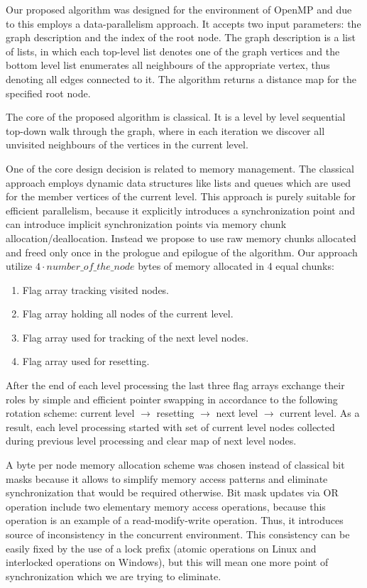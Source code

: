 \documentclass[letterpaper]{article}
\begin{document}
		
		
			Our proposed algorithm was designed for the environment of OpenMP and due to this employs a data-parallelism approach. 
			It accepts two input parameters: the graph description and the index of the root node.
			The graph description is a list of lists, in which each top-level list denotes one of the graph vertices and the bottom level list enumerates all neighbours of the appropriate vertex, thus denoting all edges connected to it.
			The algorithm returns a distance map for the specified root node.
			
			The core of the proposed algorithm is classical. 
			It is a level by level sequential top-down walk through the graph, where in each iteration we discover all unvisited neighbours of the vertices in the current level.
			
			One of the core design decision is related to memory management.
			The classical approach employs dynamic data structures like lists and queues which are used for the member vertices of the current level.
			This approach is purely suitable for efficient parallelism, because it explicitly introduces a synchronization point and can introduce implicit synchronization points via memory chunk allocation/deallocation. 
			Instead we propose to use raw memory chunks allocated and freed only once in the prologue and epilogue of the algorithm.
			Our approach utilize $4 \cdot number\_of\_the\_node$ bytes of memory allocated in 4 equal chunks:
			\begin{enumerate}
				\item Flag array tracking visited nodes.
				\item Flag array holding all nodes of the current level.
				\item Flag array used for tracking of the next level nodes.
				\item Flag array used for resetting.
			\end{enumerate}
			
			After the end of each level processing the last three flag arrays exchange their roles by simple and efficient pointer swapping in accordance to the following rotation scheme: current level $\to$ resetting $\to$ next level $\to$ current level.
			As a result, each level processing started with set of current level nodes collected during previous level processing and clear map of next level nodes. 

			A byte per node memory allocation scheme was chosen instead of classical bit masks because it allows to simplify memory access patterns and eliminate synchronization that would be required otherwise.
			Bit mask updates via OR operation include two elementary memory access operations, because this operation is an example of a read-modify-write operation.
			Thus, it introduces source of inconsistency in the concurrent environment.
			This consistency can be easily fixed by the use of a lock prefix (atomic operations on Linux and interlocked operations on Windows), but this will mean one more point of synchronization which we are trying to eliminate.
			
\end{document}
